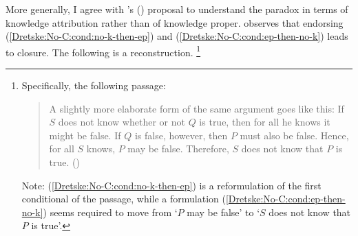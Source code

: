 \begin{note}
{      More generally, I agree with \citeauthor{Zhaoqing:2015vj}'s (\Citeyear{Zhaoqing:2015vj}) proposal to understand the paradox in terms of knowledge attribution rather than of knowledge proper.
  }
  \citeauthor{Dretske:1970to} observes that endorsing (\ref{Dretske:No-C:cond:no-k-then-ep}) and (\ref{Dretske:No-C:cond:ep-then-no-k}) leads to closure.
  The following is a reconstruction.\nolinebreak
  \footnote{
    Specifically, the following passage:
    \begin{quote}
      A slightly more elaborate form of the same argument goes like this:
      If \(S\) does not know whether or not \(Q\) is true, then for all he knows it might be false.
      If \(Q\) is false, however, then \(P\) must also be false.
      Hence, for all \(S\) knows, \(P\) may be false.
      Therefore, \(S\) does not know that \(P\) is true.\nolinebreak
      \mbox{}\hfill\mbox{(\citeyear[1011]{Dretske:1970to})}
    \end{quote}
    Note: (\ref{Dretske:No-C:cond:no-k-then-ep}) is a reformulation of the first conditional of the passage, while a formulation (\ref{Dretske:No-C:cond:ep-then-no-k}) seems required to move from `\(P\) may be false' to `\(S\) does not know that \(P\) is true'.
  }
\end{note}

